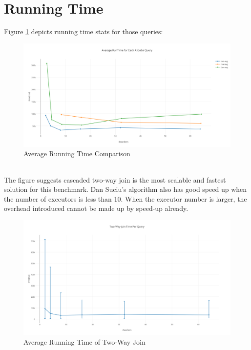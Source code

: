 \section{Running Time}
Figure \ref{fig:Average-RunTime-for-Each-Alibaba-Query} depicts running time stats for those queries:
\begin{figure}[h!]
  \caption{Average Running Time Comparison}
  \label{fig:Average-RunTime-for-Each-Alibaba-Query}
  \centering
    \includegraphics[width=1.0\textwidth]{img/Average-RunTime-for-Each-Alibaba-Query}
\end{figure}
\\The figure suggests cascaded two-way join is the most scalable and fastest solution for this benchmark. Dan Suciu's algorithm also has good speed up when the number of executors is less than 10. When the executor number is larger, the overhead introduced cannot be made up by speed-up already.
\begin{figure}[h!]
  \caption{Average Running Time of Two-Way Join}
  \label{fig:two-way-join-general}
  \centering
    \includegraphics[width=1.0\textwidth]{img/Two-Way-Join-General}
\end{figure}
